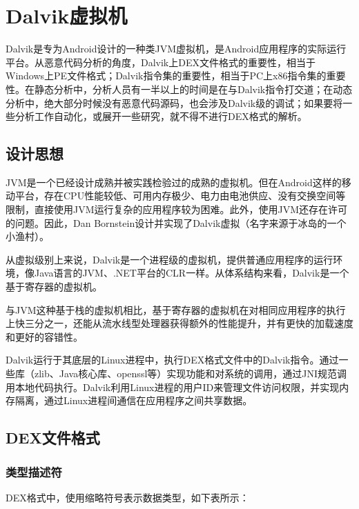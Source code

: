 \chapter{Dalvik虚拟机}
\label{Chap:dalvik}
Dalvik是专为Android设计的一种类JVM虚拟机，是Android应用程序的实际运行平台。从恶意代码分析的角度，Dalvik上DEX文件格式的重要性，相当于Windows上PE文件格式；Dalvik指令集的重要性，相当于PC上x86指令集的重要性。在静态分析中，分析人员有一半以上的时间是在与Dalvik指令打交道；在动态分析中，绝大部分时候没有恶意代码源码，也会涉及Dalvik级的调试；如果要将一些分析工作自动化，或展开一些研究，就不得不进行DEX格式的解析。

\section{设计思想}
JVM是一个已经设计成熟并被实践检验过的成熟的虚拟机。但在Android这样的移动平台，存在CPU性能较低、可用内存极少、电力由电池供应、没有交换空间等限制，直接使用JVM运行复杂的应用程序较为困难。此外，使用JVM还存在许可的问题。因此，Dan Bornstein设计并实现了Dalvik虚拟（名字来源于冰岛的一个小渔村）。

从虚拟级别上来说，Dalvik是一个进程级的虚拟机，提供普通应用程序的运行环境，像Java语言的JVM、.NET平台的CLR一样。从体系结构来看，Dalvik是一个基于寄存器的虚拟机。

与JVM这种基于栈的虚拟机相比，基于寄存器的虚拟机在对相同应用程序的执行上快三分之一，还能从流水线型处理器获得额外的性能提升，并有更快的加载速度和更好的容错性\cite{dalvik_analysis}。

Dalvik运行于其底层的Linux进程中，执行DEX格式文件中的Dalvik指令。通过一些库（zlib、Java核心库、openssl等）实现功能和对系统的调用，通过JNI规范调用本地代码执行。Dalvik利用Linux进程的用户ID来管理文件访问权限，并实现内存隔离，通过Linux进程间通信在应用程序之间共享数据。
\section{DEX文件格式}
\subsection{类型描述符}
\label{SubSec:dalvik_data_type}
DEX格式中，使用缩略符号表示数据类型，如下表所示：

